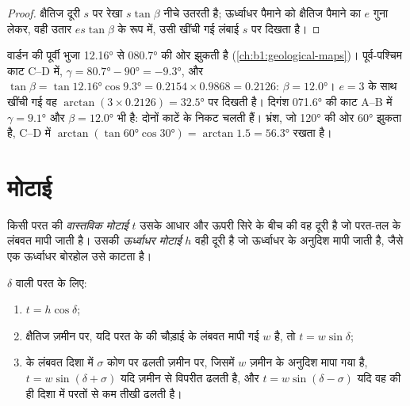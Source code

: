 \begin{proof}
क्षैतिज दूरी $s$ पर रेखा $s\tan\beta$ नीचे उतरती है; ऊर्ध्वाधर पैमाने को क्षैतिज पैमाने का $e$ गुना लेकर, वही
उतार $es\tan\beta$ के रूप में, उसी खींची गई लंबाई $s$ पर दिखता है।
\end{proof}

\begin{example}
वार्डन  की पूर्वी भुजा \ang{12.16} से \ang{080.7} की ओर झुकती है (\cref{ch:b1:geological-maps})। पूर्व-पश्चिम काट
C--D में, $\gamma = \ang{80.7} - \ang{90} = \ang{-9.3}$, और $\tan\beta =
\tan\ang{12.16}\cos\ang{9.3} = 0.2154\times0.9868 = 0.2126$: $\beta =
\ang{12.0}$। $e = 3$ के साथ खींची गई वह $\arctan(3\times0.2126) =
\ang{32.5}$ पर दिखती है। दिगंश \ang{071.6} की काट A--B में $\gamma = \ang{9.1}$
और $\beta = \ang{12.0}$ भी है: दोनों काटें  के निकट चलती हैं। भ्रंश, जो \ang{120} की ओर \ang{60} झुकता है,
C--D में  $\arctan(\tan\ang{60}\cos\ang{30}) = \arctan 1.5 = \ang{56.3}$ रखता है।
\end{example}

\section{मोटाई}

\begin{definition}[वास्तविक मोटाई, ऊर्ध्वाधर मोटाई]\label{def:b1:cross-sections:thickness}
किसी परत की \emph{वास्तविक मोटाई} $t$ उसके आधार और ऊपरी सिरे के बीच की वह दूरी है जो
परत-तल के लंबवत मापी जाती है। उसकी \emph{ऊर्ध्वाधर मोटाई} $h$ वही दूरी है जो ऊर्ध्वाधर के
अनुदिश मापी जाती है, जैसे एक ऊर्ध्वाधर बोरहोल उसे काटता है।
\end{definition}

\begin{proposition}[नत परत की मोटाई]\label{prop:b1:cross-sections:thickness}
 $\delta$ वाली परत के लिए:
\begin{enumerate}
  \item $t = h\cos\delta$;
  \item क्षैतिज ज़मीन पर, यदि परत के  की चौड़ाई  के लंबवत मापी गई $w$ है, तो $t = w\sin\delta$;
  \item {} के लंबवत दिशा में $\sigma$ कोण पर ढलती ज़मीन पर, जिसमें $w$ ज़मीन के अनुदिश मापा गया है,
        $t = w\sin(\delta + \sigma)$ यदि ज़मीन  से विपरीत ढलती है, और $t = w\sin(\delta - \sigma)$ यदि वह 
        की ही दिशा में परतों से कम तीखी ढलती है।
\end{enumerate}
\end{proposition}

